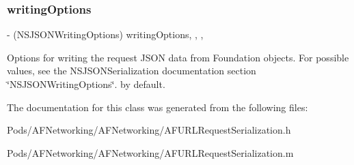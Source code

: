 \subsubsection{\texorpdfstring{writing\+Options}{writingOptions}}
{\footnotesize\ttfamily -\/ (N\+S\+J\+S\+O\+N\+Writing\+Options) writing\+Options\hspace{0.3cm}{\ttfamily [read]}, {\ttfamily [write]}, {\ttfamily [nonatomic]}, {\ttfamily [assign]}}

Options for writing the request J\+S\+ON data from Foundation objects. For possible values, see the {\ttfamily N\+S\+J\+S\+O\+N\+Serialization} documentation section \char`\"{}\+N\+S\+J\+S\+O\+N\+Writing\+Options\char`\"{}. {} by default. 

The documentation for this class was generated from the following files\+:\begin{DoxyCompactItemize}
\item 
Pods/\+A\+F\+Networking/\+A\+F\+Networking/A\+F\+U\+R\+L\+Request\+Serialization.\+h\item 
Pods/\+A\+F\+Networking/\+A\+F\+Networking/A\+F\+U\+R\+L\+Request\+Serialization.\+m\end{DoxyCompactItemize}
